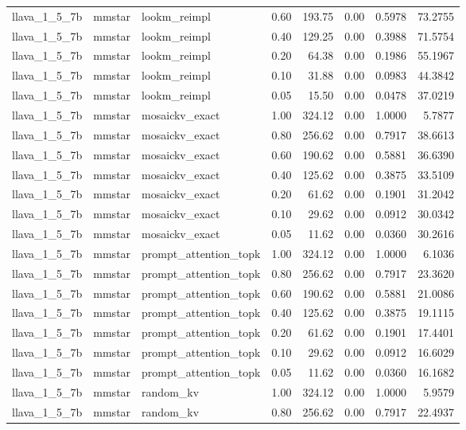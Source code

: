 \begin{longtable}{lllrrrrr}
llava\_1\_5\_7b & mmstar & lookm\_reimpl & 0.60 & 193.75 & 0.00 & 0.5978 & 73.2755 \\
llava\_1\_5\_7b & mmstar & lookm\_reimpl & 0.40 & 129.25 & 0.00 & 0.3988 & 71.5754 \\
llava\_1\_5\_7b & mmstar & lookm\_reimpl & 0.20 & 64.38 & 0.00 & 0.1986 & 55.1967 \\
llava\_1\_5\_7b & mmstar & lookm\_reimpl & 0.10 & 31.88 & 0.00 & 0.0983 & 44.3842 \\
llava\_1\_5\_7b & mmstar & lookm\_reimpl & 0.05 & 15.50 & 0.00 & 0.0478 & 37.0219 \\
llava\_1\_5\_7b & mmstar & mosaickv\_exact & 1.00 & 324.12 & 0.00 & 1.0000 & 5.7877 \\
llava\_1\_5\_7b & mmstar & mosaickv\_exact & 0.80 & 256.62 & 0.00 & 0.7917 & 38.6613 \\
llava\_1\_5\_7b & mmstar & mosaickv\_exact & 0.60 & 190.62 & 0.00 & 0.5881 & 36.6390 \\
llava\_1\_5\_7b & mmstar & mosaickv\_exact & 0.40 & 125.62 & 0.00 & 0.3875 & 33.5109 \\
llava\_1\_5\_7b & mmstar & mosaickv\_exact & 0.20 & 61.62 & 0.00 & 0.1901 & 31.2042 \\
llava\_1\_5\_7b & mmstar & mosaickv\_exact & 0.10 & 29.62 & 0.00 & 0.0912 & 30.0342 \\
llava\_1\_5\_7b & mmstar & mosaickv\_exact & 0.05 & 11.62 & 0.00 & 0.0360 & 30.2616 \\
llava\_1\_5\_7b & mmstar & prompt\_attention\_topk & 1.00 & 324.12 & 0.00 & 1.0000 & 6.1036 \\
llava\_1\_5\_7b & mmstar & prompt\_attention\_topk & 0.80 & 256.62 & 0.00 & 0.7917 & 23.3620 \\
llava\_1\_5\_7b & mmstar & prompt\_attention\_topk & 0.60 & 190.62 & 0.00 & 0.5881 & 21.0086 \\
llava\_1\_5\_7b & mmstar & prompt\_attention\_topk & 0.40 & 125.62 & 0.00 & 0.3875 & 19.1115 \\
llava\_1\_5\_7b & mmstar & prompt\_attention\_topk & 0.20 & 61.62 & 0.00 & 0.1901 & 17.4401 \\
llava\_1\_5\_7b & mmstar & prompt\_attention\_topk & 0.10 & 29.62 & 0.00 & 0.0912 & 16.6029 \\
llava\_1\_5\_7b & mmstar & prompt\_attention\_topk & 0.05 & 11.62 & 0.00 & 0.0360 & 16.1682 \\
llava\_1\_5\_7b & mmstar & random\_kv & 1.00 & 324.12 & 0.00 & 1.0000 & 5.9579 \\
llava\_1\_5\_7b & mmstar & random\_kv & 0.80 & 256.62 & 0.00 & 0.7917 & 22.4937 \\

\end{longtable}
